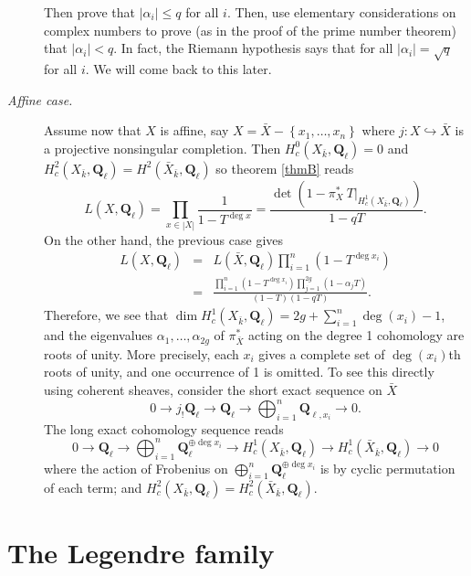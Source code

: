\begin{description}
Then prove that $|\alpha_i| \leq q$ for all $i$. Then, use elementary 
considerations on complex numbers to prove (as in the proof of the prime number 
theorem) that $|\alpha_i| < q$. In fact, the Riemann hypothesis says that for 
all $|\alpha_i| = \sqrt q$ for all $i$. We will come back to this later.

\item[\it Affine case.] 
Assume now that $X$ is affine, say $X= \bar X-\left\{x_1, \ldots, x_n\right\}$ 
where $j: X \hookrightarrow \bar X$ is a projective nonsingular completion. 
Then $H_c^0(X_{\bar k}, \mathbf{Q}_\ell) = 0$ and $H_c^2(X_{\bar k}, 
\mathbf{Q}_\ell) = H^2(\bar X_{\bar k}, \mathbf{Q}_\ell)$ so theorem \ref{thmB} 
reads
$$
L(X, \mathbf{Q}_\ell)  =  \prod_{x\in |X|}\frac{1}{1-T^{\deg x}} = 
\frac{\det\left(1-\pi_X^*\ T\big|_{H_c^1(X_{\bar k}, 
\mathbf{Q}_\ell)}\right)}{1-qT}.
$$
On the other hand, the previous case gives
\begin{eqnarray*}
L(X, \mathbf{Q}_\ell) & = & L(\bar X, 
\mathbf{Q}_\ell)\prod_{i=1}^n\left(1-T^{\deg x_i}\right) \\
& = & \frac{\prod_{i=1}^n(1-T^{\deg 
x_i})\prod_{j=1}^{2g}(1-\alpha_jT)}{(1-T)(1-qT)}.
\end{eqnarray*}
Therefore, we see that $\dim H_c^1(X_{\bar k}, \mathbf{Q}_\ell) = 
2g+\sum_{i=1}^n \deg(x_i)-1$, and the eigenvalues $\alpha_1, \ldots, 
\alpha_{2g}$ of $\pi_{\bar X}^*$ acting on the degree 1 cohomology are roots of 
unity. More precisely, each $x_i$ gives a complete set of $\deg(x_i)$th roots 
of unity, and one occurrence of 1 is omitted.  To see this directly using 
coherent sheaves, consider the short exact sequence on $\bar X$
$$
0\to j_!\mathbf{Q}_\ell\to \mathbf{Q}_\ell\to\bigoplus_{i=1}^n 
\mathbf{Q}_{\ell, x_i}\to 0.
$$
The long exact cohomology sequence reads
$$
0\to \mathbf{Q}_\ell \to \bigoplus_{i=1}^n \mathbf{Q}_\ell^{\oplus \deg x_i} 
\to H_c^1(X_{\bar k}, \mathbf{Q}_\ell) \to H_c^1(\bar X_{\bar k}, 
\mathbf{Q}_\ell)\to 0
$$
where the action of Frobenius on $\bigoplus_{i=1}^n \mathbf{Q}_\ell^{\oplus 
\deg x_i}$ is by cyclic permutation of each term; and $H_c^2(X_{\bar k}, 
\mathbf{Q}_\ell) = H_c^2(\bar X_{\bar k}, \mathbf{Q}_\ell)$.
\end{description}

\section{The Legendre family}

